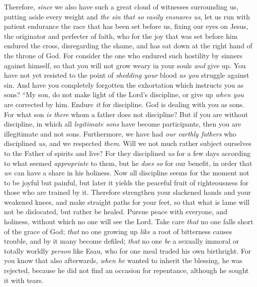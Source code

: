\begin{biblechapter} %
 Therefore, \textit{since} we also have such a great cloud of witnesses surrounding us, putting aside every weight and \textit{the sin that so easily ensnares us}, let us run with patient endurance the race that has been set before us,
\verse fixing our eyes on Jesus, the originator and perfecter of faith, who for the joy that was set before him endured the cross, disregarding the shame, and has sat down at the right hand of the throne of God.
\verse For consider the one who endured such hostility by sinners against himself, so that you will not grow weary in your souls \textit{and} give up.
\verse You have not yet resisted to the point of \textit{shedding your} blood \textit{as you} struggle against sin.
\verse And have you completely forgotten the exhortation which instructs you as sons?
\verse “My son, do not make light of the Lord’s discipline, 
or give up \textit{when you} are corrected by him.
\verse Endure \textit{it} for discipline. God is dealing with you as sons. For what son \textit{is there} whom a father does not discipline?
\verse But if you are without discipline, in which all \textit{legitimate sons} have become participants, then you are illegitimate and not sons.
\verse Furthermore, we have had \textit{our earthly fathers} who disciplined \textit{us}, and we respected \textit{them}. Will we not much rather subject ourselves to the Father of spirits and live?
\verse For they disciplined \textit{us} for a few days according to what seemed \textit{appropriate} to them, but he \textit{does so} for our benefit, in order that \textit{we} can have a share in his holiness.
\verse Now all discipline seems for the moment not to be joyful but painful, but later it yields the peaceful fruit of righteousness for those who are trained by it.
 Therefore strengthen your slackened hands and your weakened knees,
\verse and make straight paths for your feet, so that what is lame will not be dislocated, but rather be healed.
\verse Pursue peace with everyone, and holiness, without which no one will see the Lord.
\verse Take care \textit{that} no one falls short of the grace of God; \textit{that} no one growing up \textit{like} a root of bitterness causes trouble, and by it many become defiled;
\verse \textit{that} no one \textit{be} a sexually immoral or totally worldly \textit{person} like Esau, who for one meal traded his own birthright.
\verse For you know that also afterwards, \textit{when he} wanted to inherit the blessing, he was rejected, because he did not find an occasion for repentance, although he sought it with tears.

\end{biblechapter}
